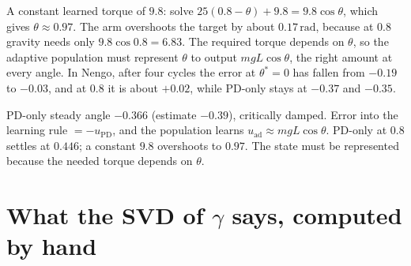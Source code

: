 \documentclass[11pt,letterpaper]{article}
\begin{document}
A constant learned torque of $9.8$: solve $25(0.8 - \theta) + 9.8 = 9.8\cos\theta$, which gives $\theta \approx 0.97$. The arm overshoots the target by about $0.17\,\mathrm{rad}$, because at $0.8$ gravity needs only $9.8\cos0.8 = 6.83$. The required torque depends on $\theta$, so the adaptive population must represent $\theta$ to output $mgL\cos\theta$, the right amount at every angle. In Nengo, after four cycles the error at $\theta^* = 0$ has fallen from $-0.19$ to $-0.03$, and at $0.8$ it is about $+0.02$, while PD-only stays at $-0.37$ and $-0.35$.
\begin{center}
\end{center}
\begin{result}
PD-only steady angle $-0.366$ (estimate $-0.39$), critically damped. Error into the learning rule $= -u_{\mathrm{PD}}$, and the population learns $u_{\mathrm{ad}} \approx mgL\cos\theta$. PD-only at $0.8$ settles at $0.446$; a constant $9.8$ overshoots to $0.97$. The state must be represented because the needed torque depends on $\theta$.
\end{result}

\section{What the SVD of $\gamma$ says, computed by hand}
\end{document}
